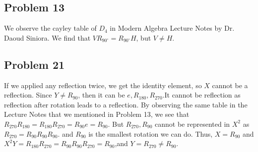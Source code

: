 \documentclass[a4paper,12pt]{article}
\begin{document}
\subsection*{Problem 13}
We observe the cayley table of $D_4$ in Modern Algebra Lecture Notes by Dr. Daoud Siniora. We find that $VR_{90^\circ} = R_{90^\circ}H$, but $V \ne H.$
\subsection*{Problem 21}
If we applied any reflection twice, we get the identity element, so $X$ cannot be a reflection. Since $Y \ne R_{90}$, then it can be $e,R_{180}, R_{270}$.It cannot be reflection as reflection after rotation leads to a reflection. By observing the same table in the Lecture Notes that we mentioned in Problem 13, we see that $R_{270}R_{180}=R_{180}R_{270}=R_{90}e=R_{90}$. But $R_{270},R_{90}$ cannot be represented in $X^2$ as $R_{270}=R_{90}R_{90}R_{90}.$ and $R_{90}$ is the smallest rotation we can do. Thus, $X=R_{90}$ and $X^2Y=R_{180}R_{270}=R_{90}R_{90}R_{270}=R_{90}$,and $Y=R_{270} \ne R_{90}.$
\end{document}
